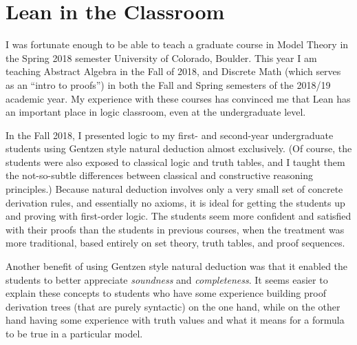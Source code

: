 \documentclass[11pt]{amsart}  %
\begin{document}





\section{Lean in the Classroom}

I was fortunate enough to be able to teach a graduate course in Model Theory
in the Spring 2018 semester University of Colorado, Boulder.  This year I am teaching Abstract Algebra in the Fall of 2018, and Discrete Math (which serves as an ``intro to proofs'') in both the Fall and Spring semesters of the 2018/19 academic year.  My experience with these courses has convinced
me that Lean has an important place in logic classroom, even at the undergraduate level.

In the Fall 2018, I presented logic to my first- and second-year undergraduate students using Gentzen style natural deduction almost exclusively. (Of course, the students were also exposed to classical logic and truth tables, and I taught them the not-so-subtle differences between classical and constructive reasoning principles.)
Because natural deduction involves only a very small set of concrete derivation rules, and essentially no axioms, it is ideal for getting the students up and proving with first-order logic. The students seem more confident and satisfied with their proofs than the students in previous courses, when the treatment was more traditional, based entirely on set theory, truth tables, and proof sequences.

Another benefit of using Gentzen style natural deduction
was that it enabled the students to better appreciate \emph{soundness} and \emph{completeness}.  
It seems easier to explain these concepts to students who have some
experience building proof derivation trees (that are purely syntactic) on the one hand, while on the other hand having some experience with truth values and what it means for a formula to be true in a particular model.
\end{document}

